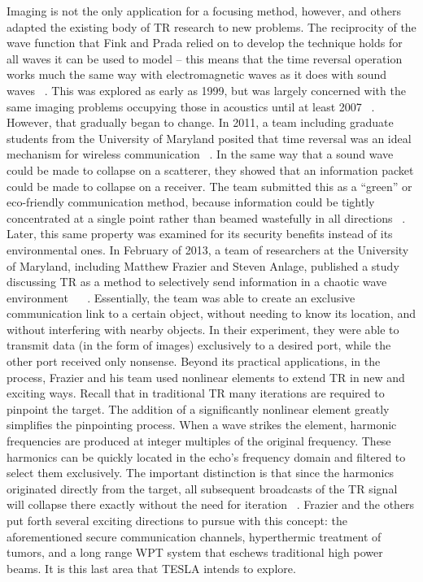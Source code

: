 Imaging is not the only application for a focusing method, however, and others adapted the existing body of TR research to new problems. The reciprocity of the wave function that Fink and Prada relied on to develop the technique holds for all waves it can be used to model – this means that the time reversal operation works much the same way with electromagnetic waves as it does with sound waves ~\cite{chambers_target_2007}. This was explored as early as 1999, but was largely concerned with the same imaging problems occupying those in acoustics until at least 2007 ~\cite{chambers_target_2007}. However, that gradually began to change. In 2011, a team including graduate students from the University of Maryland posited that time reversal was an ideal mechanism for wireless communication ~\cite{giler_demo_2009}. In the same way that a sound wave could be made to collapse on a scatterer, they showed that an information packet could be made to collapse on a receiver. The team submitted this as a “green” or eco-friendly communication method, because information could be tightly concentrated at a single point rather than beamed wastefully in all directions ~\cite{giler_demo_2009}. Later, this same property was examined for its security benefits instead of its environmental ones. In February of 2013, a team of researchers at the University of Maryland, including Matthew Frazier and Steven Anlage, published a study discussing TR as a method to selectively send information in a chaotic wave environment ~\cite{nltr-wave-chaotic} ~\cite{taddese_sensing_2010}. Essentially, the team was able to create an exclusive communication link to a certain object, without needing to know its location, and without interfering with nearby objects. In their experiment, they were able to transmit data (in the form of images) exclusively to a desired  port, while the other port received only nonsense.
Beyond its practical applications, in the process, Frazier and his team used nonlinear elements to extend TR in new and exciting ways. Recall that in traditional TR many iterations are required to pinpoint the target. The addition of a significantly nonlinear element greatly simplifies the pinpointing process. When a wave strikes the element, harmonic frequencies are produced at integer multiples of the original frequency. These harmonics can be quickly located in the echo's frequency domain and filtered to select them exclusively. The important distinction is that since the harmonics originated directly from the target, all subsequent broadcasts of the TR signal will collapse there exactly without the need for iteration ~\cite{nltr-wave-chaotic}. Frazier and the others put forth several exciting directions to pursue with this concept: the aforementioned secure communication channels, hyperthermic treatment of tumors, and a long range WPT system that eschews traditional high power beams. It is this last area that TESLA intends to explore.

